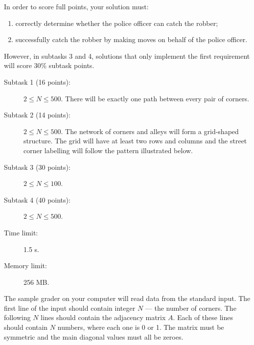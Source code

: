 \documentclass{boi2014}
\begin{document}
    \Scoring
    In order to score full points, your solution must:
    \begin{enumerate}
    	\item correctly determine whether the police officer can catch
    		the robber;
	\item successfully catch the robber by making moves on behalf
		of the police officer.
    \end{enumerate}
    
    However, in subtasks 3 and 4, solutions that only implement the
    first requirement will score 30\% subtask points. 

    \begin{description}
        \item[Subtask 1 (16 points):] $2 \le N \le 500$. There will be exactly one path between every pair of corners.
        \item[Subtask 2 (14 points):] $2 \le N \le 500$. The network of corners
        and alleys will form a grid-shaped structure. The grid will have at
        least two rows and columns and the street corner labelling will follow
        the pattern illustrated below.
        \begin{figure}[h!]
           \centering
        \end{figure}
        \item[Subtask 3 (30 points):] $2 \le N \le 100$.
        \item[Subtask 4 (40 points):] $2 \le N \le 500$.
    \end{description}

    \Constraints
    
    \begin{description}
        \item[Time limit:] 1.5 s.
        \item[Memory limit:] 256 MB.
    \end{description}

    \Experimentation
    The sample grader on your computer will read data from the standard input.
    The first line of the input should contain integer $N$ --- the number of
    corners.  The following $N$ lines should contain the adjacency matrix $A$.
    Each of these lines should contain $N$ numbers, where each one is 0 or 1.
    The matrix must be symmetric and the main diagonal values must all be
    zeroes.
\end{document}
